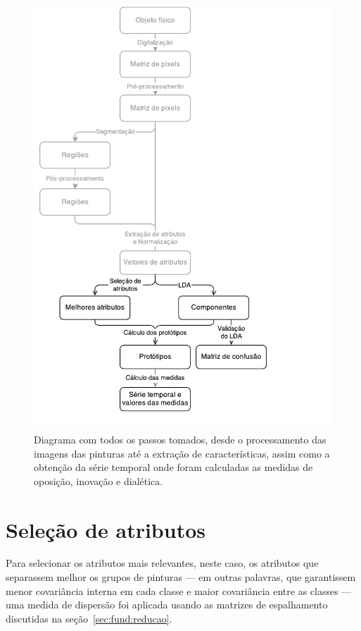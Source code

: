 \begin{figure}[h!]
\begin{center} 
          \caption{Diagrama com todos os passos tomados, desde o processamento das
        imagens das pinturas até a extração de características, assim como a
        obtenção da série temporal onde foram calculadas as medidas de oposição,
        inovação e dialética.}
        \label{fig:dataflow}
        \includegraphics[scale=.8]{figs/dataflow_pintores3}
        \fonteminha
\end{center}
\end{figure}
\clearpage
\section{Seleção de atributos}

Para selecionar os atributos mais relevantes, neste caso, os atributos
que separassem melhor os grupos de pinturas --- em outras palavras,
que garantissem menor covariância interna em cada classe e maior
covariância entre as classes --- uma medida de dispersão foi aplicada
usando as matrizes de espalhamento discutidas na
seção~\ref{sec:fund:reducao}.

